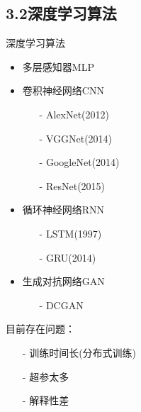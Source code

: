 \documentclass[9pt,t]{beamer} %
\begin{document}
\subsection{3.2深度学习算法}
\begin{frame}[t]{深度学习算法}
\begin{minipage}[t]{0.3 \textwidth}
\vspace{0.1cm}
\begin{itemize}
\item 多层感知器MLP
\item 卷积神经网络CNN
\begin{itemize}
\item[-] AlexNet(2012)
\item[-] VGGNet(2014)
\item[-] GoogleNet(2014)
\item[-] ResNet(2015)
\end{itemize}
\item 循环神经网络RNN
\begin{itemize}
\item[-] LSTM(1997)
\item[-] GRU(2014)
\end{itemize}
\item 生成对抗网络GAN
\begin{itemize}
\item[-] DCGAN
\end{itemize}
\end{itemize}
\vspace{0.1cm}
目前存在问题：
\begin{itemize}
\setlength\itemsep{0.03em}
\item[-] 训练时间长(分布式训练)
\item[-] 超参太多
\item[-] 解释性差
\end{itemize}


\end{minipage}
\end{frame}
\end{document}
